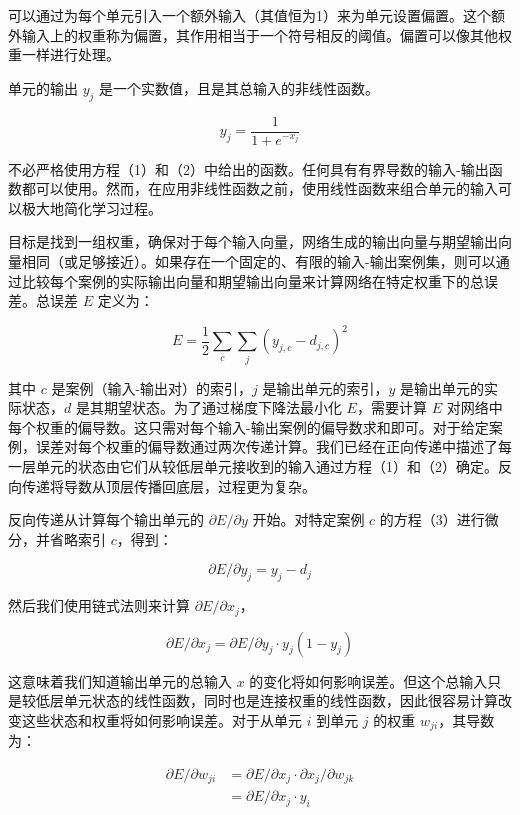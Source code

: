 \documentclass[lang=cn,a4paper,newtx]{elegantpaper}
\begin{document}
可以通过为每个单元引入一个额外输入（其值恒为1）来为单元设置偏置。这个额外输入上的权重称为偏置，其作用相当于一个符号相反的阈值。偏置可以像其他权重一样进行处理。

单元的输出 $y_j$ 是一个实数值，且是其总输入的非线性函数。

\begin{equation}
  y_j = \frac{1}{1+e^{-x_j}}
\end{equation}

不必严格使用方程（1）和（2）中给出的函数。任何具有有界导数的输入-输出函数都可以使用。然而，在应用非线性函数之前，使用线性函数来组合单元的输入可以极大地简化学习过程。

目标是找到一组权重，确保对于每个输入向量，网络生成的输出向量与期望输出向量相同（或足够接近）。如果存在一个固定的、有限的输入-输出案例集，则可以通过比较每个案例的实际输出向量和期望输出向量来计算网络在特定权重下的总误差。总误差 $E$ 定义为：

\begin{equation}
  E = \frac{1}{2} \sum_{c}\sum_{j}(y_{j,c} - d_{j,c})^2
\end{equation}

其中 $c$ 是案例（输入-输出对）的索引，$j$ 是输出单元的索引，$y$ 是输出单元的实际状态，$d$ 是其期望状态。为了通过梯度下降法最小化 $E$，需要计算 $E$ 对网络中每个权重的偏导数。这只需对每个输入-输出案例的偏导数求和即可。对于给定案例，误差对每个权重的偏导数通过两次传递计算。我们已经在正向传递中描述了每一层单元的状态由它们从较低层单元接收到的输入通过方程（1）和（2）确定。反向传递将导数从顶层传播回底层，过程更为复杂。

反向传递从计算每个输出单元的 $\partial E / \partial y$ 开始。对特定案例 $c$ 的方程（3）进行微分，并省略索引 $c$，得到：

\begin{equation}
  \partial{E} / \partial{y_j} = y_j - d_j
\end{equation}

然后我们使用链式法则来计算 $\partial{E} / \partial{x_j}$，

\begin{equation*}
  \partial E / \partial x_j = \partial E / \partial y_j \cdot y_j(1-y_j)
\end{equation*}

这意味着我们知道输出单元的总输入 $x$ 的变化将如何影响误差。但这个总输入只是较低层单元状态的线性函数，同时也是连接权重的线性函数，因此很容易计算改变这些状态和权重将如何影响误差。对于从单元 $i$ 到单元 $j$ 的权重 $w_{ji}$，其导数为：

\begin{equation}
\begin{split}
  \partial{E}/\partial{w_{ji}} &= \partial{E}/\partial{x_j}\cdot\partial{x_j}/\partial{w_{jk}} \\
                               &= \partial{E}/\partial{x_j}\cdot y_i
\end{split}
\end{equation}
\end{document}
